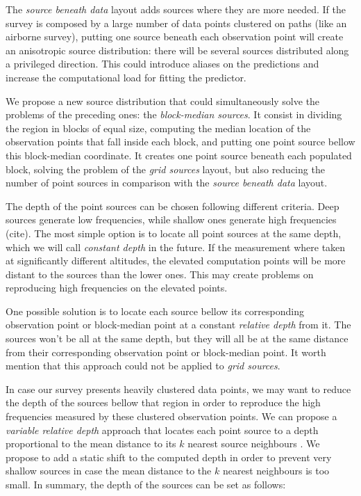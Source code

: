 \documentclass[twocolumn]{article}
\begin{document}
The \emph{source beneath data} layout adds sources where they are more needed.
If the survey is composed by a large number of data points clustered on paths
(like an airborne survey), putting one source beneath each observation point
will create an anisotropic source distribution: there will be several sources
distributed along a privileged direction.
This could introduce aliases on the predictions and increase the computational
load for fitting the predictor.

We propose a new source distribution that could simultaneously solve the
problems of the preceding ones: the \emph{block-median sources}.
It consist in dividing the region in blocks of equal size, computing the median
location of the observation points that fall inside each block, and putting one
point source bellow this block-median coordinate.
It creates one point source beneath each populated block, solving the problem
of the \emph{grid sources} layout, but also reducing the number of point
sources in comparison with the \emph{source beneath data} layout.

The depth of the point sources can be chosen following different criteria.
Deep sources generate low frequencies, while shallow ones generate high
frequencies (cite).
The most simple option is to locate all point sources at the same depth, which
we will call \emph{constant depth} in the future.
If the measurement where taken at significantly different altitudes, the
elevated computation points will be more distant to the sources than the lower
ones.
This may create problems on reproducing high frequencies on the elevated
points.

One possible solution is to locate each source bellow its corresponding
observation point or block-median point at a constant \emph{relative depth}
from it.
The sources won't be all at the same depth, but they will all be at the same
distance from their corresponding observation point or block-median point.
It worth mention that this approach could not be applied to \emph{grid
sources}.

In case our survey presents heavily clustered data points, we may want to
reduce the depth of the sources bellow that region in order to reproduce the
high frequencies measured by these clustered observation points.
We can propose a \emph{variable relative depth} approach that locates each
point source to a depth proportional to the mean distance to its $k$ nearest
source neighbours \citep{cordell1992, guspi2004, guspi2009}.
We propose to add a static shift to the computed depth in order to prevent very
shallow sources in case the mean distance to the $k$ nearest neighbours is too
small.
In summary, the depth of the sources can be set as follows:
\end{document}
